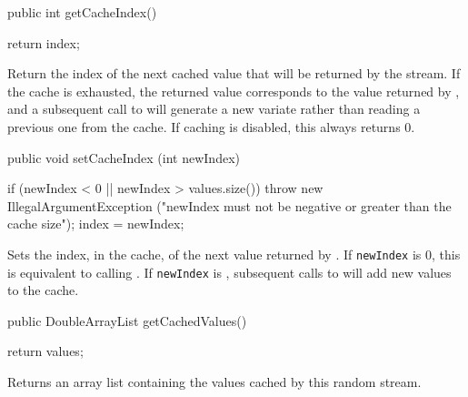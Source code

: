 \begin{code}

   public int getCacheIndex()\begin{hide} {
      return index;
   }\end{hide}
\end{code}
\begin{tabb}   Return the index of the next cached value that will be
 returned by the stream.
 If the cache is exhausted, the 
 returned value corresponds to the value returned by
 , and a subsequent call to
  will generate a new variate rather than
 reading a previous one from the cache.
 If caching is disabled, this always returns 0.
\end{tabb}
\begin{htmlonly}
\end{htmlonly}
\begin{code}

   public void setCacheIndex (int newIndex)\begin{hide} {
      if (newIndex < 0 || newIndex > values.size())
         throw new IllegalArgumentException
         ("newIndex must not be negative or greater than the cache size");
      index = newIndex;
   }\end{hide}
\end{code}
\begin{tabb}   Sets the index, in the cache, of the next value returned
 by .
 If \texttt{newIndex} is 0, this is equivalent to
 calling .
 If \texttt{newIndex} is ,
 subsequent calls to  will add
 new values to the cache.
\end{tabb}
\begin{htmlonly}
\end{htmlonly}
\begin{code}

   public DoubleArrayList getCachedValues()\begin{hide} {
      return values;
   }\end{hide}
\end{code}
\begin{tabb}   Returns an array list containing the values
 cached by this random stream.
\end{tabb}
